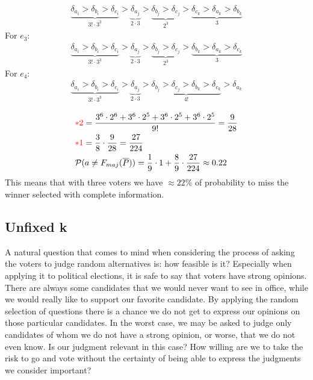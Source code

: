 \documentclass[version=3.21, pagesize, twoside=off, bibliography=totoc, DIV=calc, fontsize=12pt, a4paper]{scrartcl}
\begin{document}
 \begin{align}
 	\underbrace{\delta_{a_i}>\delta_{b_i}>\delta_{c_i}}_{3!\cdot 3^3}>\underbrace{\delta_{a_j}}_{2 \cdot 3}>\underbrace{\delta_{b_j}>\delta_{c_j}}_{2^3}>\underbrace{\delta_{c_k}>\delta_{a_k}>\delta_{b_k}}_{3}
 \end{align}
 For $e_3$:
\begin{align}
	\underbrace{\delta_{a_i}>\delta_{b_i}>\delta_{c_i}}_{3!\cdot 3^3}>\underbrace{\delta_{a_j}}_{2 \cdot 3}>\underbrace{\delta_{b_j}>\delta_{c_j}}_{2^3}>\underbrace{\delta_{b_k}>\delta_{a_k}>\delta_{c_k}}_{3}
\end{align}
 For $e_4$:
 \begin{align}
 	\underbrace{\delta_{a_i}>\delta_{b_i}>\delta_{c_i}}_{3!\cdot 3^3}>\underbrace{\delta_{a_j}}_{2 \cdot 3}>\underbrace{\delta_{b_j}>\delta_{c_j}>\delta_{b_k}>\delta_{c_k}}_{4!}>\delta_{a_k}
 \end{align}

\begin{align}
	&{\color{red}*2} =\frac{3^6\cdot2^6+3^6\cdot2^5+3^6\cdot2^5+3^6\cdot2^5}{9!} = \frac{9}{28} \\
	&{\color{red}*1} =\frac{3}{8} \cdot \frac{9}{28} = \frac{27}{224} \\
	&\mathcal{P}(a\neq F_{maj}(\overline{P})) = \frac{1}{9} \cdot 1 + \frac{8}{9} \cdot \frac{27}{224} \approx 0.22
\end{align}
This means that with three voters we have $\approx 22\%$ of probability to miss the winner selected with complete information.

\newpage
{}
\subsection{Unfixed k}
A natural question that comes to mind when considering the process of asking the voters to judge random alternatives is: how feasible is it? Especially when applying it to political elections, it is safe to say that voters have strong opinions. There are always some candidates that we would never want to see in office, while we would really like to support our favorite candidate. By applying the random selection of questions there is a chance we do not get to express our opinions on those particular candidates. In the worst case, we may be asked to judge only candidates of whom we do not have a strong opinion, or worse, that we do not even know. Is our judgment relevant in this case? How willing are we to take the risk to go and vote without the certainty of being able to express the judgments we consider important?
\end{document}
